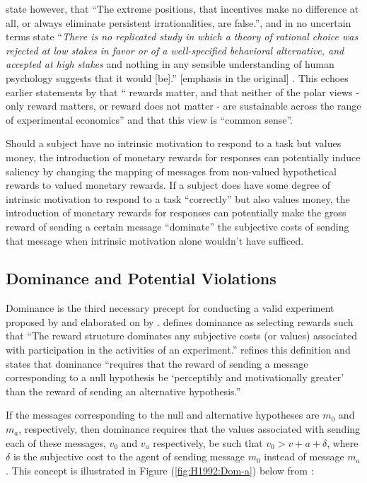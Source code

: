 \documentclass[../main.tex]{subfiles}
\begin{document}
\textcite[8]{Camerer1999} state however, that \enquote{The extreme positions, that  incentives make no difference at all, or always eliminate persistent irrationalities, are false.}, and in no uncertain terms state \enquote{\textit{There is no replicated study in which a theory of rational choice was rejected at low stakes in favor or of a well-specified behavioral alternative, and accepted at high stakes} \textelp{} and nothing in any sensible understanding of human psychology suggests that it would [be].} [emphasis in the original] \parencite*[33-34]{Camerer1999}.
This echoes earlier statements by \textcite[246]{Smith1993} that \enquote{\textelp{} rewards matter, and that neither of the polar views - only reward matters, or reward does not matter - are sustainable across the range of experimental economics} and that this view is \enquote{common sense}.

Should a subject have no intrinsic motivation to respond to a task but values money, the introduction of monetary rewards for responses can potentially induce saliency by changing the mapping of messages from non-valued hypothetical rewards to valued monetary rewards.
If a subject does have some degree of intrinsic motivation to respond to a task \enquote{correctly} but also values money, the introduction of monetary rewards for responses can potentially make the gross reward of sending a certain message \enquote{dominate} the subjective costs of sending that message when intrinsic motivation alone wouldn't have sufficed.

\singlespacing
\subsection{Dominance and Potential Violations}
\doublespacing

Dominance is the third necessary precept for conducting a valid experiment proposed by \textcite{Smith1982} and elaborated on by \textcite{Harrison1989, Harrison1992}.
\textcite[934]{Smith1982} defines dominance as selecting rewards such that \enquote{The reward structure dominates any subjective costs (or values) associated with participation in the activities of an experiment.}
\textcite[1426]{Harrison1992} refines this definition and states that dominance \enquote{requires that the reward of sending a message corresponding to a null hypothesis be \enquote{perceptibly and motivationally greater} than the reward of sending an alternative hypothesis.}

If the messages corresponding to the null and alternative hypotheses are $m_0$ and $m_a$, respectively, then dominance requires that the values associated with sending each of these messages, $v_0$ and $v_a$ respectively, be such that $v_0 > v+a + \delta$, where $\delta$ is the subjective cost to the agent of sending message $m_0$ instead of message $m_a$ \parencite[1427]{Harrison1992}.
This concept is illustrated in Figure (\ref{fig:H1992:Dom-a}) below from \textcite[1427]{Harrison1992}:
\end{document}
